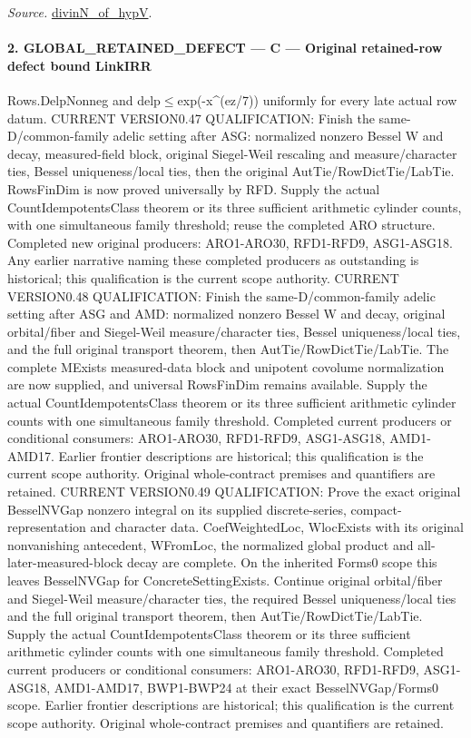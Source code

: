 \documentclass[11pt,a4paper]{article}
\numberwithin{equation}{section}
\theoremstyle{remark}\newtheorem{remark}[theorem]{Remark}
\begin{document}
\emph{Source.} \href{https://github.com/CocoSgt/riemann-hypothesis-lean/blob/7cbf7a0c32fca1badf05931879a37c3f8a2b03b4/src/Development/AutomorphicArithmetic/CharacterBoxes/DivinNOfHypV.lean#L117-L134}{divinN\_\allowbreak of\_\allowbreak hypV}.



\paragraph{2. GLOBAL\_\allowbreak RETAINED\_\allowbreak DEFECT — C — Original retained-row defect bound LinkIRR}

Rows.DelpNonneg and delp$\le$exp(-x\textasciicircum{}(ez/7)) uniformly for every late actual row datum. CURRENT VERSION0.47 QUALIFICATION: Finish the same-D/common-family adelic setting after ASG: normalized nonzero Bessel W and decay, measured-field block, original Siegel-Weil rescaling and measure/character ties, Bessel uniqueness/local ties, then the original AutTie/RowDictTie/LabTie. RowsFinDim is now proved universally by RFD. Supply the actual CountIdempotentsClass theorem or its three sufficient arithmetic cylinder counts, with one simultaneous family threshold; reuse the completed ARO structure. Completed new original producers: ARO1-ARO30, RFD1-RFD9, ASG1-ASG18. Any earlier narrative naming these completed producers as outstanding is historical; this qualification is the current scope authority. CURRENT VERSION0.48 QUALIFICATION: Finish the same-D/common-family adelic setting after ASG and AMD: normalized nonzero Bessel W and decay, original orbital/fiber and Siegel-Weil measure/character ties, Bessel uniqueness/local ties, and the full original transport theorem, then AutTie/RowDictTie/LabTie. The complete MExists measured-data block and unipotent covolume normalization are now supplied, and universal RowsFinDim remains available. Supply the actual CountIdempotentsClass theorem or its three sufficient arithmetic cylinder counts with one simultaneous family threshold. Completed current producers or conditional consumers: ARO1-ARO30, RFD1-RFD9, ASG1-ASG18, AMD1-AMD17. Earlier frontier descriptions are historical; this qualification is the current scope authority. Original whole-contract premises and quantifiers are retained. CURRENT VERSION0.49 QUALIFICATION: Prove the exact original BesselNVGap nonzero integral on its supplied discrete-series, compact-representation and character data. CoefWeightedLoc, WlocExists with its original nonvanishing antecedent, WFromLoc, the normalized global product and all-later-measured-block decay are complete. On the inherited Forms0 scope this leaves BesselNVGap for ConcreteSettingExists. Continue original orbital/fiber and Siegel-Weil measure/character ties, the required Bessel uniqueness/local ties and the full original transport theorem, then AutTie/RowDictTie/LabTie. Supply the actual CountIdempotentsClass theorem or its three sufficient arithmetic cylinder counts with one simultaneous family threshold. Completed current producers or conditional consumers: ARO1-ARO30, RFD1-RFD9, ASG1-ASG18, AMD1-AMD17, BWP1-BWP24 at their exact BesselNVGap/Forms0 scope. Earlier frontier descriptions are historical; this qualification is the current scope authority. Original whole-contract premises and quantifiers are retained.
\end{document}
